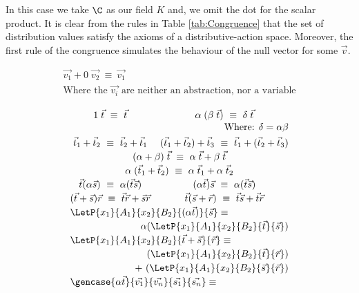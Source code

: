In this case we take $\C$ as our field $K$ and, we omit the dot for the scalar product. It is clear from the rules in Table \ref{tab:Congruence} that the set of distribution values satisfy the axioms of a distributive-action space. Moreover, the first rule of the congruence simulates the behaviour of the null vector for some $\vec{v}$. 

\begin{table*}[tb]
  \small
  \vspace*{0.2cm}
  \[
    \begin{array}{l}
      \vec{v_1} + 0\; \vec{v_2}~\equiv~\vec{v_1}\\  
      \text{Where the $\vec{v_i}$ are neither an abstraction, nor a variable}
    \end{array}   
  \]
  
  \[\renewcommand*{\arraystretch}{1.2}
    \begin{array}{c c}
      1\;\vec{t}~\equiv~\vec{t}&
      \alpha\;(\beta\;\vec{t})~\equiv~\delta\;\vec{t}\\[-2pt]
      \multicolumn{2}{r}{\text{Where: } \delta = \alpha\beta}\\[2pt]
      \vec{t}_1+\vec{t}_2 ~\equiv~\vec{t}_2+\vec{t}_1 &
      (\vec{t}_1+\vec{t}_2)+\vec{t}_3~\equiv~\vec{t}_1+(\vec{t}_2+\vec{t}_3)\\
      \multicolumn{2}{c}{(\alpha+\beta)\;\vec{t}~\equiv~\alpha\;\vec{t}+\beta\;\vec{t}}\\
      \multicolumn{2}{c}{\alpha\;(\vec{t}_1+\vec{t}_2)~\equiv~\alpha\;\vec{t}_1+\alpha\;\vec{t}_2}\\
      \vec t (\alpha \vec s)~\equiv~ \alpha (\vec{t}\vec{s})&
      (\alpha \vec t) \vec s ~\equiv~ \alpha (\vec{t}\vec{s})\\
      (\vec t + \vec s) \vec{r}~\equiv~\vec{t}\vec{r} + \vec{s}\vec{r} &
      \vec t(\vec{s}+\vec{r})~\equiv~\vec{t}\vec{s} + \vec{t}\vec{r}\\
      \multicolumn{2}{l}{\LetP{x_1}{A_1}{x_2}{B_2}{(\alpha\vec{t})}{\vec{s}}\equiv}\\
      \multicolumn{2}{r}{\alpha(\LetP{x_1}{A_1}{x_2}{B_2}{\vec{t}}{\vec{s}})}\\
      \multicolumn{2}{l}{\LetP{x_1}{A_1}{x_2}{B_2}{\vec{t}+\vec{s}}{\vec{r}}\equiv}\\
      \multicolumn{2}{r}{(\LetP{x_1}{A_1}{x_2}{B_2}{\vec{t}}{\vec{r}})}\\
      \multicolumn{2}{r}{+~(\LetP{x_1}{A_1}{x_2}{B_2}{\vec{s}}{\vec{r}})}\\
      \multicolumn{2}{l}{\gencase{\alpha \vec{t}}{\vec{v_1}}{\vec{v_n}}{\vec{s_1}}{\vec{s_n}}\equiv}\\

\end{array}\]
\end{table*}
